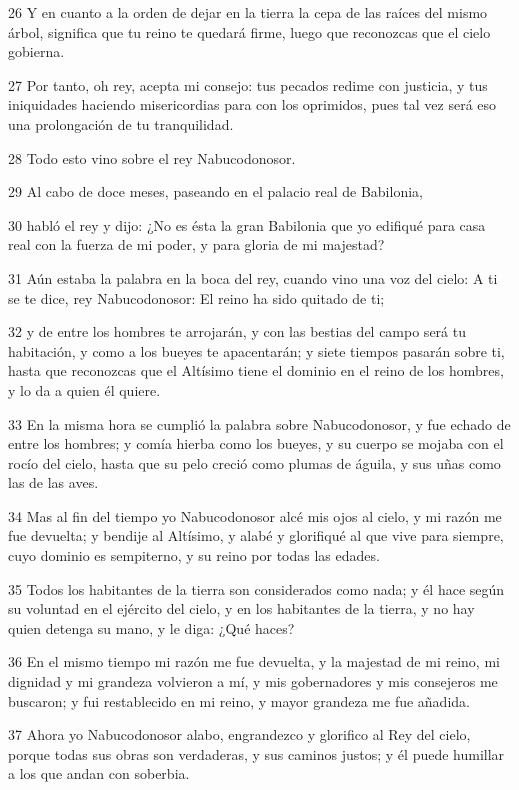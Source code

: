 \par 26 Y en cuanto a la orden de dejar en la tierra la cepa de las raíces del mismo árbol, significa que tu reino te quedará firme, luego que reconozcas que el cielo gobierna.
\par 27 Por tanto, oh rey, acepta mi consejo: tus pecados redime con justicia, y tus iniquidades haciendo misericordias para con los oprimidos, pues tal vez será eso una prolongación de tu tranquilidad.
\par 28 Todo esto vino sobre el rey Nabucodonosor.
\par 29 Al cabo de doce meses, paseando en el palacio real de Babilonia,
\par 30 habló el rey y dijo: ¿No es ésta la gran Babilonia que yo edifiqué para casa real con la fuerza de mi poder, y para gloria de mi majestad?
\par 31 Aún estaba la palabra en la boca del rey, cuando vino una voz del cielo: A ti se te dice, rey Nabucodonosor: El reino ha sido quitado de ti;
\par 32 y de entre los hombres te arrojarán, y con las bestias del campo será tu habitación, y como a los bueyes te apacentarán; y siete tiempos pasarán sobre ti, hasta que reconozcas que el Altísimo tiene el dominio en el reino de los hombres, y lo da a quien él quiere.
\par 33 En la misma hora se cumplió la palabra sobre Nabucodonosor, y fue echado de entre los hombres; y comía hierba como los bueyes, y su cuerpo se mojaba con el rocío del cielo, hasta que su pelo creció como plumas de águila, y sus uñas como las de las aves.
\par 34 Mas al fin del tiempo yo Nabucodonosor alcé mis ojos al cielo, y mi razón me fue devuelta; y bendije al Altísimo, y alabé y glorifiqué al que vive para siempre, cuyo dominio es sempiterno, y su reino por todas las edades.
\par 35 Todos los habitantes de la tierra son considerados como nada; y él hace según su voluntad en el ejército del cielo, y en los habitantes de la tierra, y no hay quien detenga su mano, y le diga: ¿Qué haces?
\par 36 En el mismo tiempo mi razón me fue devuelta, y la majestad de mi reino, mi dignidad y mi grandeza volvieron a mí, y mis gobernadores y mis consejeros me buscaron; y fui restablecido en mi reino, y mayor grandeza me fue añadida.
\par 37 Ahora yo Nabucodonosor alabo, engrandezco y glorifico al Rey del cielo, porque todas sus obras son verdaderas, y sus caminos justos; y él puede humillar a los que andan con soberbia.

